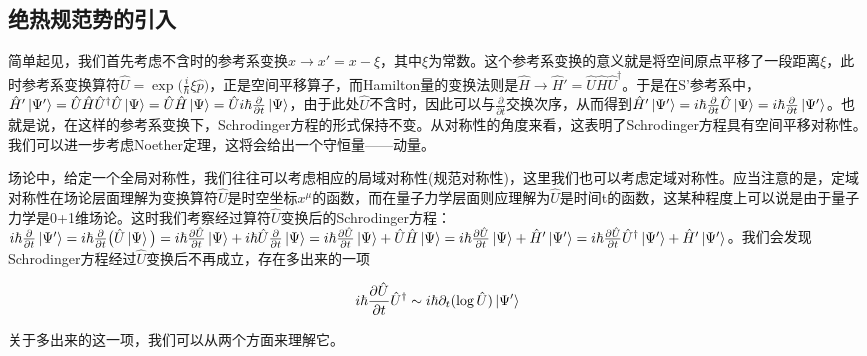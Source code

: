\documentclass[a4paper]{article}
\begin{document}
        \subsection{绝热规范势的引入}

        简单起见，我们首先考虑不含时的参考系变换$x\rightarrow x'=x-\xi$，其中$\xi$为常数。这个参考系变换的意义就是将空间原点平移了一段距离$\xi$，此时参考系变换算符$\hat{U}=\exp\big(\frac{i}{\hbar}\xi\hat{p} \big)$，正是空间平移算子，而Hamilton量的变换法则是$\hat{H}\rightarrow \hat{H}'=\hat{U}\hat{H}\hat{U}^\dagger$。于是在S'参考系中，$\hat{H}'\ket{\Psi'}=\hat{U}\hat{H}\hat{U}^\dagger\hat{U}\ket{\Psi}=\hat{U}\hat{H}\ket{\Psi}=\hat{U} i\hbar\frac{\partial}{\partial t}\ket{\Psi}$，由于此处$\hat{U}$不含时，因此可以与$\frac{\partial}{\partial t}$交换次序，从而得到$\hat{H}'\ket{\Psi'}=i\hbar\frac{\partial}{\partial t}\hat{U}\ket{\Psi}=i\hbar\frac{\partial}{\partial t}\ket{\Psi'}$。也就是说，在这样的参考系变换下，Schrodinger方程的形式保持不变。从对称性的角度来看，这表明了Schrodinger方程具有空间平移对称性。我们可以进一步考虑Noether定理，这将会给出一个守恒量——动量。

        场论中，给定一个全局对称性，我们往往可以考虑相应的局域对称性(规范对称性)，这里我们也可以考虑定域对称性。应当注意的是，定域对称性在场论层面理解为变换算符$\hat{U}$是时空坐标$x^\mu$的函数，而在量子力学层面则应理解为$\hat{U}$是时间t的函数，这某种程度上可以说是由于量子力学是0+1维场论。这时我们考察经过算符$\hat{U}$变换后的Schrodinger方程：$i\hbar\frac{\partial}{\partial t}\ket{\Psi'} = i\hbar\frac{\partial}{\partial t}\big(\hat{U}\ket{\Psi}\big) = i\hbar\frac{\partial\hat{U}}{\partial t}\ket{\Psi} + i\hbar\hat{U}\frac{\partial}{\partial t}\ket{\Psi} = i\hbar\frac{\partial\hat{U}}{\partial t}\ket{\Psi} + \hat{U}\hat{H}\ket{\Psi} = i\hbar\frac{\partial\hat{U}}{\partial t}\ket{\Psi} + \hat{H}'\ket{\Psi'} = i\hbar\frac{\partial\hat{U}}{\partial t}\hat{U}^\dagger\ket{\Psi'} + \hat{H}'\ket{\Psi'}$。我们会发现Schrodinger方程经过$\hat{U}$变换后不再成立，存在多出来的一项
        
        \begin{equation}
            i\hbar\frac{\partial\hat{U}}{\partial t}\hat{U}^\dagger\sim i\hbar\partial_t(\log\hat{U})\ket{\Psi'}
        \end{equation}

        关于多出来的这一项，我们可以从两个方面来理解它。
\end{document}
